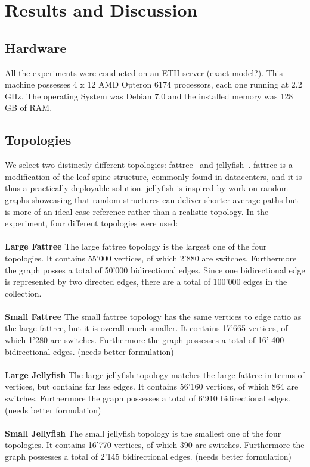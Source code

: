 \documentclass[11pt,singlecolumn]{scrartcl}
\begin{document}

\section{Results and Discussion}

\subsection{Hardware}
All the experiments were conducted on an ETH server (exact model?). This machine possesses 4 x 12 AMD Opteron 6174 processors, each one running at 2.2 GHz. The operating System was Debian 7.0 and the installed memory was 128 GB of RAM.
\subsection{Topologies}
We select two distinctly different
topologies: fattree~\cite{FatTree} and jellyfish~\cite{Jellyfish}. fattree is a modification of the leaf-spine structure, commonly found in datacenters, and it is thus a practically deployable solution. jellyfish is inspired by work on random graphs showcasing that random structures can deliver shorter average paths but is more of an ideal-case reference rather than a realistic topology.
In the experiment, four different topologies were used:\\\\
\textbf{Large Fattree} \quad  The large fattree topology is the largest one of the four topologies. It contains 55'000 vertices, of which 2'880 are switches. Furthermore the graph posses a total of 50'000 bidirectional edges. Since one bidirectional edge is represented by two directed edges, there are a total of 100'000 edges in the collection.\\\\
\textbf{Small Fattree} \quad The small fattree topology has the same vertices to edge ratio as the large fattree, but it is overall much smaller. It contains 17'665 vertices, of which 1'280 are switches. Furthermore the graph possesses a total of 16' 400 bidirectional edges. (needs better formulation) \\\\
\textbf{Large Jellyfish} \quad  The large jellyfish topology matches the large fattree in terms of vertices, but contains far less edges. It contains 56'160 vertices, of which 864 are switches. Furthermore the graph possesses a total of 6'910 bidirectional edges. (needs better formulation)\\\\
\textbf{Small Jellyfish} \quad The small jellyfish topology is the smallest one of the four topologies. It contains 16'770 vertices, of which 390 are switches. Furthermore the graph possesses a total of 2'145 bidirectional edges. (needs better formulation)
\end{document}
